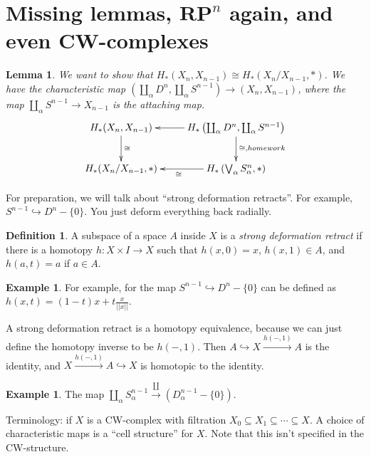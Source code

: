 \documentclass{amsart}
\theoremstyle{theorem}
\newtheorem{lemma}[theorem]{Lemma}
\theoremstyle{definition}
\newtheorem{definition}[theorem]{Definition}
\newtheorem{example}[theorem]{Example}
\begin{document}
\section{Missing lemmas, $\mathbf{RP}^n$ again, and even CW-complexes}
\begin{lemma}
We want to show that $ H_\ast(X_n,X_{n-1})\cong H_\ast(X_n/X_{n-1},\ast)$. We have the characteristic map $\left(\coprod_\alpha D^n,\coprod_\alpha S^{n-1}\right)\to (X_n,X_{n-1})$, where the map $\coprod_\alpha S^{n-1}\to X_{n-1}$ is the attaching map.
\begin{equation*}
\xymatrix{ H_\ast(X_n,X_{n-1})\ar[d]^\cong & H_\ast\left(\coprod_\alpha D^n,\coprod_\alpha S^{n-1}\right)\ar[l]\ar[d]^{\cong,homework}\\
 H_\ast(X_n/X_{n-1},\ast) & H_\ast\left(\bigvee_{\alpha}S^n_\alpha,\ast\right)\ar[l]^\cong}
\end{equation*}
\end{lemma}
For preparation, we will talk about ``strong deformation retracts''. For example, $S^{n-1}\hookrightarrow D^n-\{0\}$. You just deform everything back radially.
\begin{definition}
A subspace of a space $A$ inside $X$ is a \emph{strong deformation retract} if there is a homotopy $h:X\times I\to X$ such that $h(x,0)=x$, $h(x,1)\in A$, and $h(a,t)=a$ if $a\in A$.
\end{definition}
\begin{example}
For example, for the map $S^{n-1}\hookrightarrow D^n-\{0\}$ can be defined as $h(x,t)=(1-t)x+t\frac{x}{||x||}$.
\end{example}
A strong deformation retract is a homotopy equivalence, because we can just define the homotopy inverse to be $h(-,1)$. Then $A\hookrightarrow X\xrightarrow{h(-,1)}A$ is the identity, and $X\xrightarrow{h(-,1)}A\hookrightarrow X$ is homotopic to the identity.
\begin{example}
The map $\coprod_\alpha S^{n-1}_\alpha\xrightarrow\coprod(D^{n-1}_\alpha-\{0\})$.
\end{example}
Terminology: if $X$ is a CW-complex with filtration $X_0\subseteq X_1\subseteq\cdots\subseteq X$. A choice of characteristic maps is a ``cell structure'' for $X$. Note that this isn't specified in the CW-structure.
\end{document}
